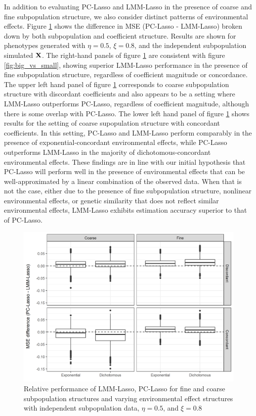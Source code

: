 In addition to evaluating PC-Lasso and LMM-Lasso in the presence of coarse and fine subpopulation structure, we also consider distinct patterns of environmental effects. Figure \ref{fig:big_small_gamma} shows the difference in MSE (PC-Lasso - LMM-Lasso) broken down by both subpopulation and coefficient structure. Results are shown for phenotypes generated with $\eta = 0.5$, $\xi = 0.8$, and the independent subpopulation simulated $\textbf{X}$. The right-hand panels of figure \ref{fig:big_small_gamma} are consistent with figure \ref{fig:big_vs_small}, showing superior LMM-Lasso performance in the presence of fine subpopulation structure, regardless of coefficient magnitude or concordance. The upper left hand panel of figure \ref{fig:big_small_gamma} corresponds to coarse subpopulation structure with discordant coefficients and also appears to be a setting where LMM-Lasso outperforms PC-Lasso, regardless of coefficient magnitude, although there is some overlap with PC-Lasso. The lower left hand panel of figure \ref{fig:big_small_gamma} shows results for the setting of coarse supopulation structure with concordant coefficients. In this setting, PC-Lasso and LMM-Lasso perform comparably in the presence of exponential-concordant environmental effects, while PC-Lasso outperforms LMM-Lasso in the majority of dichotomous-concordant environmental effects. These findings are in line with our initial hypothesis that PC-Lasso will perform well in the presence of environmental effects that can be well-approximated by a linear combination of the observed data. When that is not the case, either due to the presence of fine subpopulation structure, nonlinear environmental effects, or genetic similarity that does not reflect similar environmental effects, LMM-Lasso exhibits estimation accuracy superior to that of PC-Lasso.

\begin{figure}[H]
    \centering
    \includegraphics[scale = 0.9]{figures/mse_diff_hetero.png}
    \caption{Relative performance of LMM-Lasso, PC-Lasso for fine and coarse subpopulation structures and varying environmental effect structures with independent subpopulation data, $\eta = 0.5$, and $\xi = 0.8$}
    \label{fig:big_small_gamma}
\end{figure}

